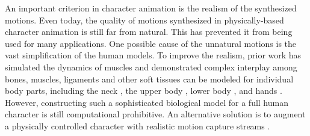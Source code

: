 An important criterion in character animation is the realism of the synthesized motions. Even today, the quality of motions synthesized in physically-based character animation is still far from natural. This has prevented it from being used for many applications. One possible cause of the unnatural motions is the vast simplification of the human models. To improve the realism, prior work has simulated the dynamics of muscles and demonstrated complex interplay among bones, muscles, ligaments and other soft tissues can be modeled for individual body parts, including
the neck \cite{Lee:2006}, the upper body \cite{Zordan:2006,Dilorenzo:2008,Lee:2009:CBM}, lower body \cite{Wang:2012}, and hands
\cite{Tsang:2005,Sueda:2008}. However, constructing such a sophisticated biological model for a full human character is still computational prohibitive. An alternative solution is to augment a physically controlled character with realistic motion capture streams \cite{daSilva:2008,Muico:2009:CAN,Liu:2010}. 














